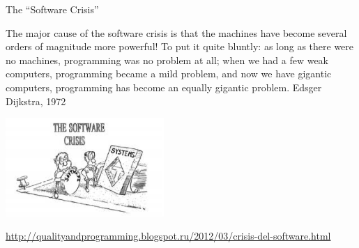 \documentclass{beamer}
\begin{document}
\begin{frame}{\centerline{The ``Software Crisis''}}
The major cause of the software crisis is that the machines have become several orders of magnitude more powerful! To put it quite bluntly: as long as there were no machines, programming was no problem at all; when we had a few weak computers, programming became a mild problem, and now we have gigantic computers, programming has become an equally gigantic problem.
Edsger Dijkstra, 1972

\begin{center}
\includegraphics[width=60mm]{A2022.IDSEPC.ProcessoDiProduzione/pic-01.png}
\end{center}



\begin{center}
\tiny
\url{http://qualityandprogramming.blogspot.ru/2012/03/crisis-del-software.html}
\end{center}

\end{frame}
\end{document}
